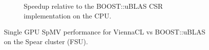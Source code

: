 \begin{figure}
\begin{subfigure}[t]{0.48\textwidth}
\caption{Speedup relative to the BOOST::uBLAS CSR implementation on the CPU.}
\label{fig:spear_vcl_speedup}
\end{subfigure} 
\caption{Single GPU SpMV performance for ViennaCL vs BOOST::uBLAS on the Spear cluster (FSU). }
\end{figure}




%    

%
%

